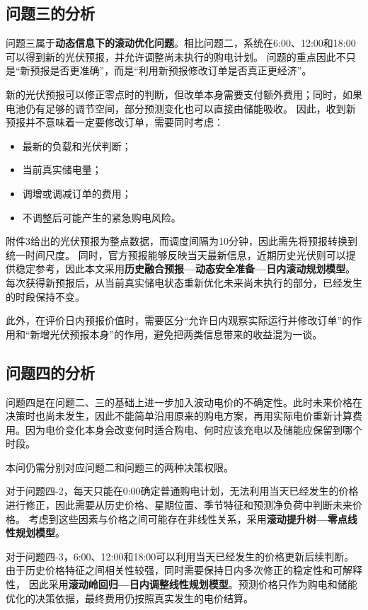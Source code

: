 \subsection{问题三的分析}
问题三属于\textbf{动态信息下的滚动优化问题}。相比问题二，系统在6:00、12:00和18:00可以得到新的光伏预报，并允许调整尚未执行的购电计划。
问题的重点因此不只是“新预报是否更准确”，而是“利用新预报修改订单是否真正更经济”。

新的光伏预报可以修正零点时的判断，但改单本身需要支付额外费用；同时，如果电池仍有足够的调节空间，部分预测变化也可以直接由储能吸收。
因此，收到新预报并不意味着一定要修改订单，需要同时考虑：

\begin{itemize}
    \item 最新的负载和光伏判断；
    \item 当前真实储电量；
    \item 调增或调减订单的费用；
    \item 不调整后可能产生的紧急购电风险。
\end{itemize}

附件3给出的光伏预报为整点数据，而调度间隔为10分钟，因此需先将预报转换到统一时间尺度。
同时，官方预报能够反映当天最新信息，近期历史光伏则可以提供稳定参考，因此本文采用\textbf{历史融合预报—动态安全准备—日内滚动规划模型}。
每次获得新预报后，从当前真实储电状态重新优化未来尚未执行的部分，已经发生的时段保持不变。

此外，在评价日内预报价值时，需要区分“允许日内观察实际运行并修改订单”的作用和“新增光伏预报本身”的作用，避免把两类信息带来的收益混为一谈。

\subsection{问题四的分析}

问题四是在问题二、三的基础上进一步加入波动电价的不确定性。此时未来价格在决策时也尚未发生，因此不能简单沿用原来的购电方案，再用实际电价重新计算费用。因为电价变化本身会改变何时适合购电、何时应该充电以及储能应保留到哪个时段。

本问仍需分别对应问题二和问题三的两种决策权限。

对于问题四-2，每天只能在0:00确定普通购电计划，无法利用当天已经发生的价格进行修正，因此需要从历史价格、星期位置、季节特征和预测净负荷中判断未来价格。
考虑到这些因素与价格之间可能存在非线性关系，采用\textbf{滚动提升树—零点线性规划模型}。

对于问题四-3，6:00、12:00和18:00可以利用当天已经发生的价格更新后续判断。
由于历史价格特征之间相关性较强，同时需要保持日内多次修正的稳定性和可解释性，
因此采用\textbf{滚动岭回归—日内调整线性规划模型}。预测价格只作为购电和储能优化的决策依据，最终费用仍按照真实发生的电价结算。